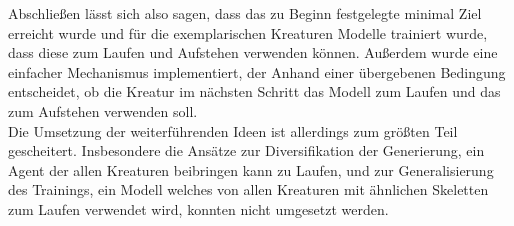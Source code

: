 Abschließen lässt sich also sagen, dass das zu Beginn festgelegte minimal Ziel erreicht wurde und für die exemplarischen Kreaturen Modelle trainiert wurde, dass diese zum Laufen und Aufstehen verwenden können. Außerdem wurde eine einfacher Mechanismus implementiert, der Anhand einer übergebenen Bedingung entscheidet, ob die Kreatur im nächsten Schritt das Modell zum Laufen und das zum Aufstehen verwenden soll. \\
Die Umsetzung der weiterführenden Ideen ist allerdings zum größten Teil gescheitert. 
Insbesondere die Ansätze zur Diversifikation der Generierung, ein Agent der allen Kreaturen beibringen kann zu Laufen, und zur Generalisierung des Trainings, ein Modell welches von allen Kreaturen mit ähnlichen Skeletten zum Laufen verwendet wird, konnten nicht umgesetzt werden.
